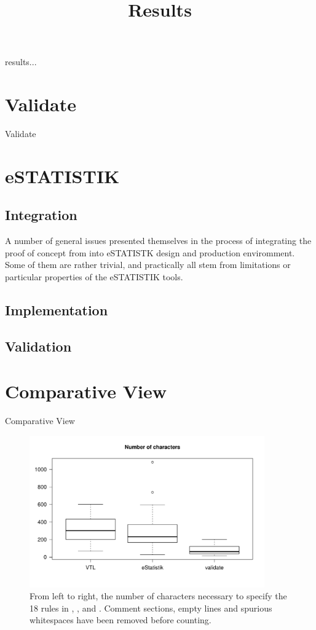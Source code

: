 \title{Results}

results...

\section{Validate}

Validate

\section{eSTATISTIK}

\subsection{Integration}

A number of general  issues presented themselves in the process of integrating the proof of concept from \citep{GIT:2015} into eSTATISTK design and production enviromment. Some of them are rather trivial, and practically all stem from limitations or particular properties of the eSTATISTIK tools.



 

\subsection{Implementation}

\subsection{Validation}

\section{Comparative View}

Comparative View

\begin{figure}
\centering
\includegraphics[width=0.9\textwidth]{fig/boxplot.pdf}
\caption{From left to right, the number of characters necessary
to specify the 18 rules in , , and .
Comment sections, empty lines and spurious whitespaces have been removed before
counting. }
\end{figure}

